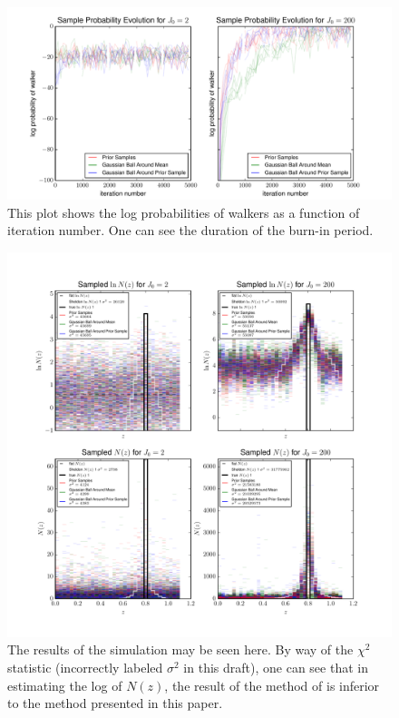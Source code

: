 \documentclass[12pt, onecolumn]{emulateapj}
\begin{document}
\begin{figure}
\label{fig:dumbestprob}
\includegraphics[scale=0.25]{lnprobs.pdf}
\caption{This plot shows the log probabilities of walkers as a function of iteration number.  One can see the duration of the burn-in period.}
\end{figure}

\begin{figure}
\label{fig:dumbestparam}
\includegraphics[scale=0.25]{results.pdf}
\caption{The results of the simulation may be seen here.  By way of the $\chi^{2}$ statistic (incorrectly labeled $\sigma^{2}$ in this draft), one can see that in estimating the log of $N(z)$, the result of the method of \citet{she11} is inferior to the method presented in this paper.}
\end{figure}
\end{document}

